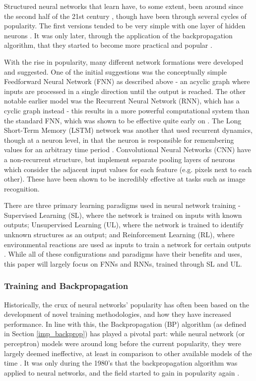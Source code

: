 \documentclass[a4paper,11pt,oneside]{article}
\theoremstyle{plain}
\theoremstyle{definition}
\begin{document}
	Structured neural networks that learn have, to some extent, been around since the second half of the 21st 
	century \citep{Schmidhuber}, though have been through several cycles of popularity. The first versions tended to be very simple 
	with one layer of hidden neurons \citep{Ivakhnenko}. It was only later, through the application of 
	the backpropagation algorithm, that they started to become more practical and popular \citep{Werbos}.
	\hfill \break 
	
	With the rise in popularity, many different network formations were developed and suggested. One of the initial 
	suggestions was the conceptually simple Feedforward Neural Network (FNN) as described above - an acyclic
	graph where inputs are processed in a single direction until the output is reached. The other notable earlier model 
	was the Recurrent Neural Network (RNN), which has a cyclic graph instead - this results in a more powerful 
	computational system than the standard FNN, which was shown to be effective quite early on 
	\citep{Siegelmann}. The Long Short-Term Memory (LSTM) network was 
	another that used recurrent dynamics, though at a neuron level, in that the neuron is responsible for remembering 
	values for an arbitrary time period \citep{Hochreiter}. Convolutional Neural Networks (CNN) have a non-recurrent structure, 
	but implement separate pooling layers of neurons which consider the adjacent input values for each feature 
	(e.g. pixels next to each other). These have been shown to be incredibly effective at tasks such as image 
	recognition.
	\hfill \break 
	
	There are three primary learning paradigms used in neural network training - Supervised Learning (SL), 
	where the network is trained on inputs with known outputs; Unsupervised Learning (UL), where the network is 
	trained to identify unknown structures as an output; and Reinforcement Learning (RL), where environmental
	reactions are used as inputs to train a network for certain outputs \citep{Schmidhuber}. While all of these configurations and paradigms 
	have their benefits and uses, this paper will largely focus on FNNs and RNNs, trained through SL and UL.
	\hfill \break 
	
	\subsubsection{Training and Backpropagation}\label{lr_trainingbackprop}
	
	Historically, the crux of neural networks' popularity has often been based on the development of novel training 
	methodologies, and how they have increased performance. In line with this, the Backpropagation (BP) algorithm (as defined in Section \ref{imp_backprop})
	has played a pivotal part: while neural network (or perceptron) models were around long before the current popularity, 
	they were largely deemed ineffective, at least in comparison to other available models of the time 
	\citep{Minksy}. It was only during the 1980’s that the backpropagation algorithm was applied to neural networks, and 
	the field started to gain in popularity again \citep{LeCun2, Werbos2}. 
	\hfill \break 
	
\end{document}
